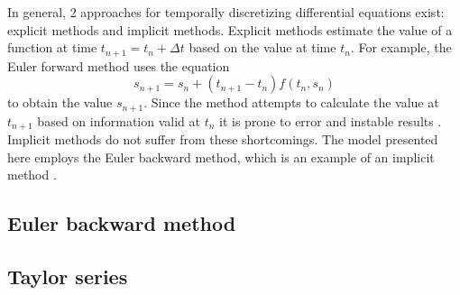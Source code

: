 In general, 2 approaches for temporally discretizing differential equations exist:  explicit methods and implicit methods.  Explicit methods estimate the value of a function at time $t_{n+1} = t_n + \Delta t$ based on the value at time $t_n$. For example, the Euler forward method uses the equation
\begin{equation}
  \label{eq:euformeth}
  s_{n+1} = s_n + (t_{n+1} - t_n) f(t_n,s_n)
\end{equation}
to obtain the value $s_{n+1}$.  Since the method attempts to calculate the value at $t_{n+1}$ based on information valid at $t_n$ it is prone to error and instable results \parencite{Weisstein2017a}.  Implicit methods do not suffer from these shortcomings.  The model presented here employs the Euler backward method, which is an example of an implicit method \parencite{Weisstein2017b}.

\subsection{Euler backward method}


\subsection{Taylor series}



% 





